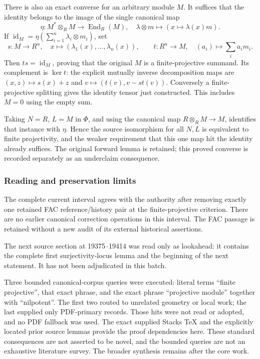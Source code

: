 There is also an exact converse for an arbitrary module \(M\). It suffices that the identity belongs to the image of the single canonical map \[
\eta:M^*\otimes_RM\longrightarrow\operatorname{End}_R(M),
\quad \lambda\otimes m\longmapsto(x\mapsto\lambda(x)m).
\] If \(\operatorname{id}_M=\eta(\sum_{i=1}^n\lambda_i\otimes m_i)\), set \[
s:M\to R^n,\quad x\mapsto(\lambda_1(x),\ldots,\lambda_n(x)),
\qquad
t:R^n\to M,\quad(a_i)\mapsto\sum_i a_i m_i.
\] Then \(ts=\operatorname{id}_M\), proving that the original \(M\) is a finite-projective summand. Its complement is \(\ker t\): the explicit mutually inverse decomposition maps are \((x,z)\mapsto s(x)+z\) and \(v\mapsto(t(v),v-st(v))\). Conversely a finite-projective splitting gives the identity tensor just constructed. This includes \(M=0\) using the empty sum.

Taking \(N=R\), \(L=M\) in \(\Phi\), and using the canonical map \(R\otimes_RM\to M\), identifies that instance with \(\eta\). Hence the source isomorphism for all \(N,L\) is equivalent to finite projectivity, and the weaker requirement that this one map hit the identity already suffices. The original forward lemma is retained; this proved converse is recorded separately as an underclaim consequence.

\subsubsection{Reading and preservation limits}\label{algebra-proof-009-reading-and-preservation-limits}

The complete current interval agrees with the authority after removing exactly one retained FAC reference/history pair at the finite-projective criterion. There are no earlier canonical correction operations in this interval. The FAC passage is retained without a new audit of its external historical assertions.

The next source section at 19375--19414 was read only as lookahead: it contains the complete first surjectivity-locus lemma and the beginning of the next statement. It has not been adjudicated in this batch.

Three bounded canonical-corpus queries were executed: literal terms ``finite projective'', that exact phrase, and the exact phrase ``projective module'' together with ``nilpotent''. The first two routed to unrelated geometry or local work; the last supplied only PDF-primary records. Those hits were not read or adopted, and no PDF fallback was used. The exact supplied Stacks TeX and the explicitly located prior source lemmas provide the proof dependencies here. These standard consequences are not asserted to be novel, and the bounded queries are not an exhaustive literature survey. The broader synthesis remains after the core work.
